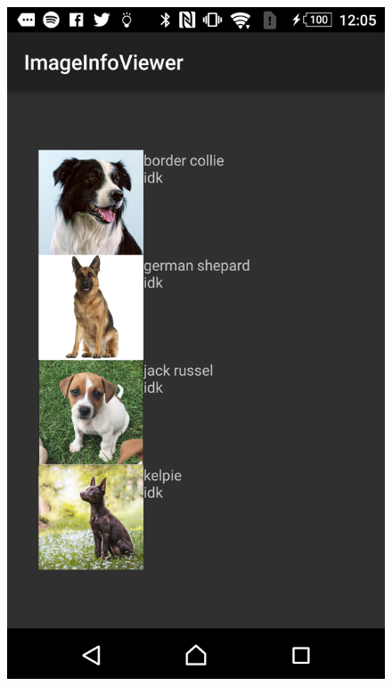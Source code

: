 \documentclass{scrartcl}
\begin{document}
\begin{figure}[h]
    \includegraphics[scale=0.15]{images/screen7.png}

\end{figure}
\end{document}
